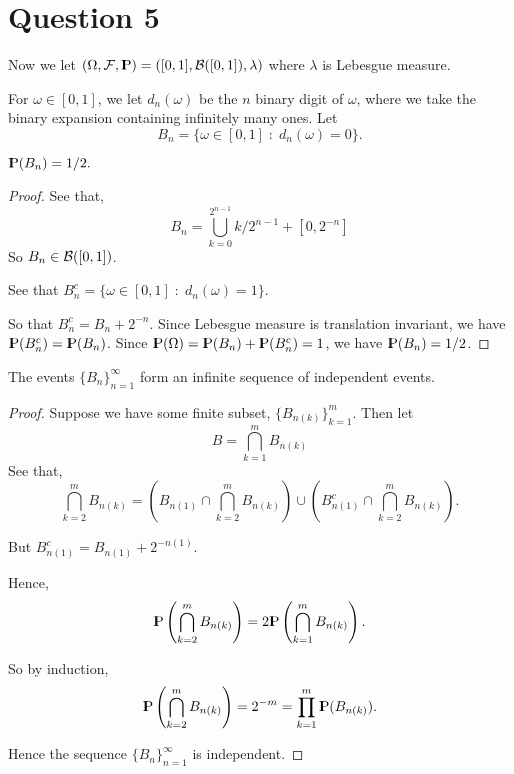 \documentclass{unswmaths}
\begin{document}
\section*{Question 5}
Now we let $(\Omega,\mathcal{F},{\rm I\kern-.3em P}) = ([0,1],\mathcal{B}([0,1]),\lambda)$
where $\lambda$ is Lebesgue measure.

For $\omega \in [0,1]$, we let $d_n(\omega)$ be the $n$ binary digit
of $\omega$, where we take the binary expansion containing infinitely many ones.
Let 
\begin{equation*}
    B_n = \{\omega \in [0,1]\;:\;d_n(\omega) = 0\}.
\end{equation*}

\begin{lemma}
    ${\rm I\kern-.3em P}(B_n) = 1/2.$
\end{lemma}
\begin{proof}
    See that,
    \begin{equation*}
        B_n = \bigcup_{k=0}^{2^{n-1}}k/2^{n-1}+[0,2^{-n}]
    \end{equation*}
    So $B_n \in \mathcal{B}([0,1])$.


    See that $B_n^c = \{\omega \in [0,1]\;:\;d_n(\omega) = 1\}$.
    
    So that $B_n^c = B_n+2^{-n}$. Since Lebesgue measure
    is translation invariant, we have ${\rm I\kern-.3em P}(B_n^c) = {\rm I\kern-.3em P}(B_n)$.
    Since ${\rm I\kern-.3em P}(\Omega) = {\rm I\kern-.3em P}(B_n)+{\rm I\kern-.3em P}(B_n^c) = 1$,
    we have ${\rm I\kern-.3em P}(B_n) = 1/2$.
\end{proof}

\begin{lemma}
    The events $\{B_n\}_{n=1}^\infty$ form an infinite sequence of independent
    events.
\end{lemma}
\begin{proof}
    Suppose we have some finite subset, $\{B_{n(k)}\}_{k=1}^m$. Then let
    \begin{equation*}
        B = \bigcap_{k=1}^m B_{n(k)}
    \end{equation*}
    See that,
    \begin{equation*}
        \bigcap_{k=2}^m B_{n(k)} = \left(B_{n(1)}\cap\bigcap_{k=2}^m B_{n(k)}\right)\cup \left(B_{n(1)}^c\cap\bigcap_{k=2}^m B_{n(k)}\right).
    \end{equation*}
    
    But $B_{n(1)}^c = B_{n(1)}+2^{-n(1)}$.
    
    Hence, 
    \begin{equation*}
        {\rm I\kern-.3em P}\left(\bigcap_{k=2}^m B_{n(k)}\right) = 2{\rm I\kern-.3em P}\left(\bigcap_{k=1}^m B_{n(k)}\right).
    \end{equation*}
    
    So by induction,
    \begin{equation*}
        {\rm I\kern-.3em P}\left(\bigcap_{k=2}^m B_{n(k)} \right) = 2^{-m} = \prod_{k=1}^m {\rm I\kern-.3em P}(B_{n(k)}).
    \end{equation*}
    
    Hence the sequence $\{B_n\}_{n=1}^\infty$ is independent.
\end{proof}
\end{document}
